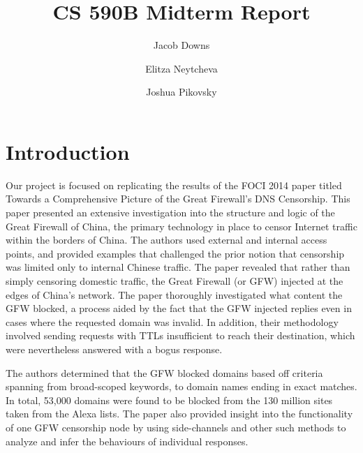 \documentclass[format=acmsmall, screen=true]{acmart}
\begin{document}
\title[]{CS 590B Midterm Report}

\author{Jacob Downs}

\author{Elitza Neytcheva}

\author{Joshua Pikovsky}



\begin{abstract}

\end{abstract}




\maketitle









\section{Introduction}


Our project is focused on replicating the results of the FOCI  2014 paper titled Towards a Comprehensive Picture of the Great Firewall’s DNS Censorship. This paper presented an extensive investigation into the structure and logic of the Great Firewall of China, the primary technology in place to censor Internet traffic within the borders of China. The authors used external and internal access points, and provided examples that challenged the prior notion that censorship was limited only to internal Chinese traffic. The paper revealed that rather than simply censoring domestic traffic, the Great Firewall (or GFW) injected at the edges of China’s network. The paper thoroughly investigated what content the GFW blocked, a process aided by the fact that the GFW injected replies even in cases where the requested domain was invalid. In addition, their methodology involved sending requests with TTLs insufficient to reach their destination, which were nevertheless answered with a bogus response. 


The authors determined that the GFW blocked domains based off criteria spanning from broad-scoped keywords, to domain names ending in exact matches. In total, 53,000 domains were found to be blocked from the 130 million sites taken from the Alexa lists. The paper also provided insight into the functionality of one GFW censorship node by using side-channels and other such methods to analyze and infer the behaviours of individual responses. 
\end{document}
